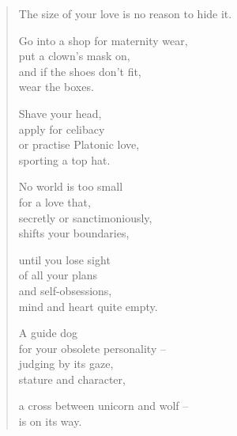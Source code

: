 \begin{verse}

The size of your love is no reason to hide it.

Go into a shop for maternity wear,\\
put a clown's mask on,\\
and if the shoes don't fit,\\
wear the boxes.

Shave your head,\\
apply for celibacy\\
or practise Platonic love,\\
sporting a top hat.

No world is too small\\
for a love that,\\
secretly or sanctimoniously,\\
shifts your boundaries,

until you lose sight\\
of all your plans\\
and self-obsessions,\\
mind and heart quite empty.

A guide dog\\
for your obsolete personality --\\
judging by its gaze,\\
stature and character,

a cross between unicorn and wolf --\\
is on its way.

\end{verse}
